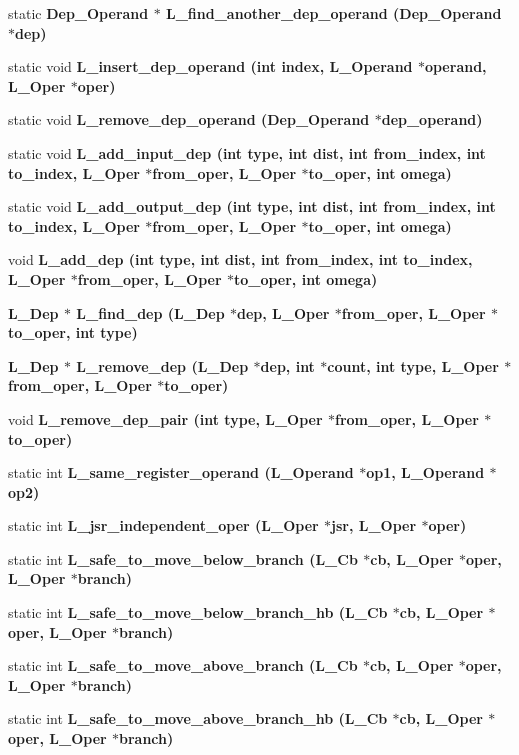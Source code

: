 \begin{CompactItemize}
\item 
static \bf{Dep\_\-Operand} $\ast$ \bf{L\_\-find\_\-another\_\-dep\_\-operand} (\bf{Dep\_\-Operand} $\ast$dep)
\item 
static void \bf{L\_\-insert\_\-dep\_\-operand} (int index, L\_\-Operand $\ast$operand, L\_\-Oper $\ast$oper)
\item 
static void \bf{L\_\-remove\_\-dep\_\-operand} (\bf{Dep\_\-Operand} $\ast$dep\_\-operand)
\item 
static void \bf{L\_\-add\_\-input\_\-dep} (int type, int dist, int from\_\-index, int to\_\-index, L\_\-Oper $\ast$from\_\-oper, L\_\-Oper $\ast$to\_\-oper, int omega)
\item 
static void \bf{L\_\-add\_\-output\_\-dep} (int type, int dist, int from\_\-index, int to\_\-index, L\_\-Oper $\ast$from\_\-oper, L\_\-Oper $\ast$to\_\-oper, int omega)
\item 
void \bf{L\_\-add\_\-dep} (int type, int dist, int from\_\-index, int to\_\-index, L\_\-Oper $\ast$from\_\-oper, L\_\-Oper $\ast$to\_\-oper, int omega)
\item 
\bf{L\_\-Dep} $\ast$ \bf{L\_\-find\_\-dep} (\bf{L\_\-Dep} $\ast$dep, L\_\-Oper $\ast$from\_\-oper, L\_\-Oper $\ast$to\_\-oper, int type)
\item 
\bf{L\_\-Dep} $\ast$ \bf{L\_\-remove\_\-dep} (\bf{L\_\-Dep} $\ast$dep, int $\ast$count, int type, L\_\-Oper $\ast$from\_\-oper, L\_\-Oper $\ast$to\_\-oper)
\item 
void \bf{L\_\-remove\_\-dep\_\-pair} (int type, L\_\-Oper $\ast$from\_\-oper, L\_\-Oper $\ast$to\_\-oper)
\item 
static int \bf{L\_\-same\_\-register\_\-operand} (L\_\-Operand $\ast$op1, L\_\-Operand $\ast$op2)
\item 
static int \bf{L\_\-jsr\_\-independent\_\-oper} (L\_\-Oper $\ast$jsr, L\_\-Oper $\ast$oper)
\item 
static int \bf{L\_\-safe\_\-to\_\-move\_\-below\_\-branch} (L\_\-Cb $\ast$cb, L\_\-Oper $\ast$oper, L\_\-Oper $\ast$branch)
\item 
static int \bf{L\_\-safe\_\-to\_\-move\_\-below\_\-branch\_\-hb} (L\_\-Cb $\ast$cb, L\_\-Oper $\ast$oper, L\_\-Oper $\ast$branch)
\item 
static int \bf{L\_\-safe\_\-to\_\-move\_\-above\_\-branch} (L\_\-Cb $\ast$cb, L\_\-Oper $\ast$oper, L\_\-Oper $\ast$branch)
\item 
static int \bf{L\_\-safe\_\-to\_\-move\_\-above\_\-branch\_\-hb} (L\_\-Cb $\ast$cb, L\_\-Oper $\ast$oper, L\_\-Oper $\ast$branch)

\end{CompactItemize}
